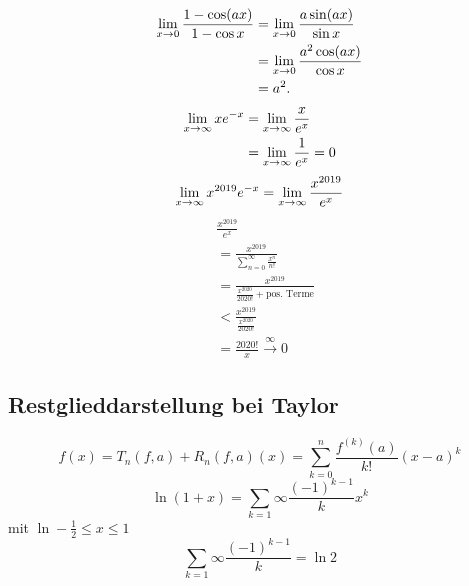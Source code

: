 \documentclass[../ana2.tex]{subfiles}
\begin{document}
\begin{bsp}
    \begin{align*}
        \lim\limits_{x\rightarrow{}0} \frac{1 - \cos(ax)}{1 - \cos x} 
        &= \lim\limits_{x\rightarrow{}0} \frac{a \sin(ax)}{\sin x} \\
        &= \lim\limits_{x\rightarrow{}0} \frac{a^2 \cos(ax)}{\cos x} \\
        &= a^2.
    \end{align*}
    \begin{align*}
        \lim\limits_{x\rightarrow\infty} x e^{-x} &= \lim\limits_{x\rightarrow\infty} \frac{x}{e^x} \\
        &= \lim\limits_{x\rightarrow\infty} \frac{1}{e^x} = 0
    \end{align*}
    \[ \lim\limits_{x\rightarrow\infty} x^{2019} e^{-x} 
    = \lim\limits_{x\rightarrow\infty} \frac{x^{2019}}{e^x} \]
    \begin{align*}
        &\frac{x^{2019}}{e^x} \\
        &= \frac{x^{2019}}{\sum_{n=0}^{\infty} \frac{x^n}{n!}} \\
        &= \frac{x^{2019}}{\frac{x^{2020}}{2020!} + \text{pos. Terme}}\\
        &< \frac{x^{2019}}{\frac{x^{2020}}{2020!}}\\
        &= \frac{2020!}{x} \overset{\infty}{\rightarrow} 0
    \end{align*}
\end{bsp}

\subsection{Restglieddarstellung bei Taylor}

\[ f(x) = T_n(f,a) + R_n(f,a)(x) = \sum_{k=0}^{n} 
\frac{f^{(k)}(a)}{k!}(x-a)^k \]
\[ \ln(1+x) = \sum_{k=1}{\infty} \frac{(-1)^{k-1}}{k} x^k \]
mit \( \ln -\frac{1}{2} \leq x \leq 1 \)
\[ \sum_{k=1}{\infty} \frac{(-1)^{k-1}}{k} = \ln 2 \]
\end{document}

